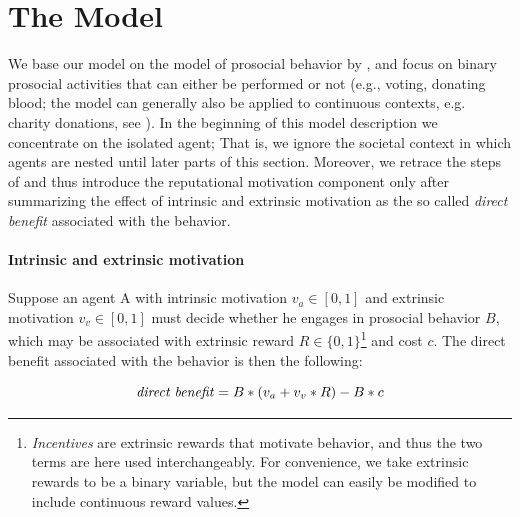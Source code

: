 \documentclass[AER]{AEA}
\begin{document}
\section{The Model}

We base our model on the model of prosocial behavior by \cite{benabou_incentives_2006}, and focus on binary prosocial activities that can either be performed or not (e.g., voting, donating blood; the model can generally also be applied to continuous contexts, e.g. charity donations, see \cite{benabou_incentives_2006}). In the beginning of this model description we concentrate on the isolated agent; That is, we ignore the societal context in which agents are nested until later parts of this section. Moreover, we retrace the steps of \cite{benabou_incentives_2006} and thus introduce the reputational motivation component only after summarizing the effect of intrinsic and extrinsic motivation as the so called \textit{direct benefit} associated with the behavior.

\paragraph{Intrinsic and extrinsic motivation}

Suppose an agent A with intrinsic motivation $v_{a} \in [0,1]$ and extrinsic motivation $v_{v} \in [0,1]$ must decide whether he engages in prosocial behavior $B$, which may be associated with extrinsic reward $R \in \{0,1\}$\footnote{\textit{Incentives} are extrinsic rewards that motivate behavior, and thus the two terms are here used interchangeably. For convenience, we take extrinsic rewards to be a binary variable, but the model can easily be modified to include continuous reward values.} and cost $c$. The direct benefit associated with the behavior is then the following: 

\begin{equation} 
 \mbox{\textit{direct benefit}} = B * (v_{a} + v_{v} * R) - B * c
\end{equation}
\end{document}
